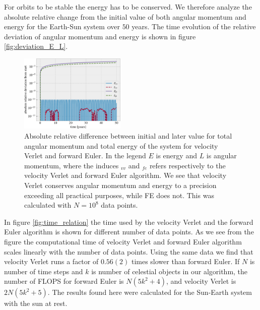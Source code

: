 \documentclass[%
 reprint,
nofootinbib,
aps,
]{revtex4-1}
\begin{document}
For orbits to be stable the energy has to be conserved. We therefore analyze the absolute relative change from the initial value of both angular momentum and energy for the Earth-Sun system over $50$ years. The time evolution of the relative deviation of angular momentum and energy is shown in figure \vref{fig:deviation_E_L}.

\begin{figure}
  \centering
  \includegraphics[width=0.45\textwidth]{../figures/deviation_E_L_2.pdf}
  \caption{Absolute relative difference between initial and later value for total angular momentum and total energy of the system for velocity Verlet and forward Euler. In the legend $E$ is energy and $L$ is angular momentum, where the induces $_{vv}$ and $_{fe}$ refers respectively to the velocity Verlet and forward Euler algorithm. We see that velocity Verlet conserves angular momentum and energy to a precision exceeding all practical purposes, while FE does not. This was calculated with $N=10^{8}$ data points.}
  \label{fig:deviation_E_L}
\end{figure}

In figure \vref{fig:time_relation} the time used by the velocity Verlet and the forward Euler algorithm is shown for different number of data points. As we see from the figure the computational time of velocity Verlet and forward Euler algorithm scales linearly with the number of data points. Using the same data we find that velocity Verlet runs a factor of $0.56(2)$ times slower than forward Euler. If $N$ is number of time steps and $k$ is number of celestial objects in our algorithm, the number of FLOPS for forward Euler is $N\left(5k^2+4\right)$, and velocity Verlet is $2N\left(5k^2 +5\right)$. The results found here were calculated for the Sun-Earth system with the sun at rest.
\end{document}
